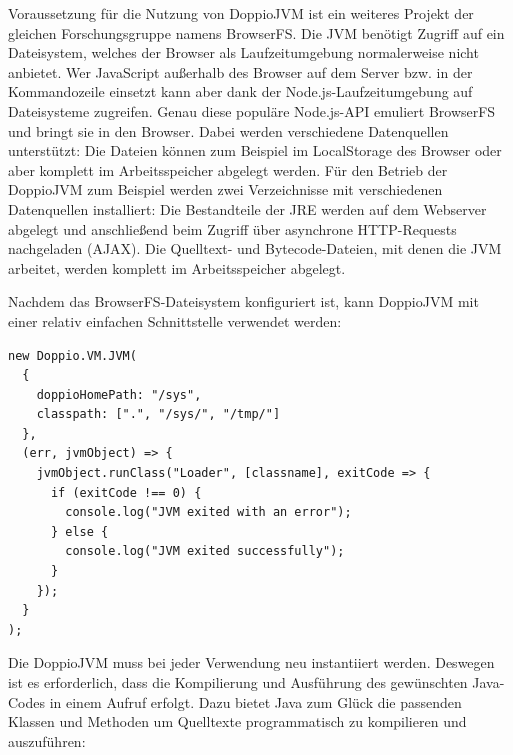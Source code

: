 Voraussetzung für die Nutzung von DoppioJVM ist ein weiteres Projekt der gleichen Forschungsgruppe namens BrowserFS. Die JVM benötigt Zugriff auf ein Dateisystem, welches der Browser als Laufzeitumgebung normalerweise nicht anbietet. Wer JavaScript außerhalb des Browser auf dem Server bzw. in der Kommandozeile einsetzt kann aber dank der Node.js-Laufzeitumgebung auf Dateisysteme zugreifen. Genau diese populäre Node.js-API emuliert BrowserFS und bringt sie in den Browser. Dabei werden verschiedene Datenquellen unterstützt: Die Dateien können zum Beispiel im LocalStorage des Browser oder aber komplett im Arbeitsspeicher abgelegt werden. Für den Betrieb der DoppioJVM zum Beispiel werden zwei Verzeichnisse mit verschiedenen Datenquellen installiert: Die Bestandteile der JRE werden auf dem Webserver abgelegt und anschließend beim Zugriff über asynchrone HTTP-Requests nachgeladen (AJAX). Die Quelltext- und Bytecode-Dateien, mit denen die JVM arbeitet, werden komplett im Arbeitsspeicher abgelegt.

Nachdem das BrowserFS-Dateisystem konfiguriert ist, kann DoppioJVM mit einer relativ einfachen Schnittstelle verwendet werden:

\begin{minipage}{\linewidth}
\begin{lstlisting}[caption={Instantiierung der DoppioJVM (aus: src/server/actions/doppio.js)}]
new Doppio.VM.JVM(
  {
    doppioHomePath: "/sys",
    classpath: [".", "/sys/", "/tmp/"]
  },
  (err, jvmObject) => {
    jvmObject.runClass("Loader", [classname], exitCode => {
      if (exitCode !== 0) {
        console.log("JVM exited with an error");
      } else {
        console.log("JVM exited successfully");
      }
    });
  }
);
\end{lstlisting}
\end{minipage}

Die DoppioJVM muss bei jeder Verwendung neu instantiiert werden. Deswegen ist es erforderlich, dass die Kompilierung und Ausführung des gewünschten Java-Codes in einem Aufruf erfolgt. Dazu bietet Java zum Glück die passenden Klassen und Methoden um Quelltexte programmatisch zu kompilieren und auszuführen:

